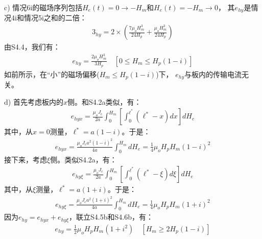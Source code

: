 c) 情况6i的磁场序列包括$H_e(t)=0\rightarrow -H_m$和$H_e(t)=-H_m\rightarrow 0$，
其$e_{hy}$是情况4i和情况5i之和的二倍：
\begin{align*}%
3_{hy}=2\times\left(\frac{7\mu_oH_{m}^{3}}{24H_p}+\frac{\mu_oH_{m}^{3}}{24H_p}\right) \tag{S4.4}
\end{align*}
由S4.4，我们有：
\begin{align*}%
e_{hy}=\frac{2\mu_oH_{m}^{3}}{3H_p} \quad [0\leq H_m\leq H_p(1-i)] \tag{7.22c}
\end{align*}
如前所示，在“小”的磁场偏移($H_m\le H_p(1-i)$)下，
$e_{hy}$与板内的传输电流无关。

d) 首先考虑板内的$x$侧。和S4.2a类似，有：
\begin{align*}%
e_{hyx}=\frac{\mu_oJ_c}{2a}\int_{0}^{H_m}\left[\int_{0}^{\ell^*}(\ell^*-x)dx\right]dH_e \tag{4.5a}
\end{align*}
其中，从$x=0$测量，$\ell^*=a(1-i)$。于是：
\begin{align*}%
e_{hyx}=\frac{\mu_oJ_ca^2(1-i)^2}{4a}\int_{0}^{H_m}dH_e=\frac{1}{4}\mu_oH_pH_m(1-i)^2 \tag{S4.5b}
\end{align*}
接下来，考虑$\xi$侧。类似S4.2a，有：
\begin{align*}%
e_{hy\xi}=\frac{\mu_oJ_c}{2a}\int_{0}^{H_m}\left[\int_{0}^{\ell^*}(\ell^*-\xi)d\xi\right]dH_e \tag{S4.6a}
\end{align*}
其中，从$\xi$测量，$\ell^*=a(1+i)$。于是：
\begin{align*}%
e_{hy\xi}=\frac{\mu_oJ_ca^2(1+i)^2}{4a}\int_{0}^{H_m}dH_e=\frac{1}{4}\mu_oH_pH_m(1+i)^2\tag{S4.6b}
\end{align*}
因为$e_{hy}=e_{hyx}+e_{hy\xi}$，联立S4.5b和S4.6b，有：
\begin{align*}%
e_{hy}=\frac{1}{2}\mu_oH_pH_m(1+i^2) \quad [H_m\geq 2H_p(1-i)] \tag{7.23a}
\end{align*}

